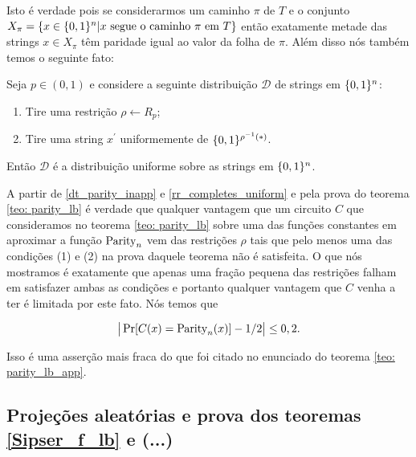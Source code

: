 Isto é verdade pois se considerarmos um caminho $\pi$ de $T$ e o conjunto $X_{\pi} = \{x \in \{0, 1\}^{n} \lvert x \text{ segue o caminho } \pi \text{ em } T\}$ então exatamente metade das strings $x \in X_{\pi}$ têm paridade igual ao valor da folha de $\pi$. Além disso nós também temos o seguinte fato:

\begin{fato} \label{rr_completes_uniform}

Seja $p \in (0, 1)$ e considere a seguinte distribuição $\mathcal{D}$ de strings em $\{0, 1\}^{n}$:

\begin{enumerate}

	\item Tire uma restrição $\rho \leftarrow R_{p}$;
	
	\item Tire uma string $x^{\prime}$ uniformemente de $\{0, 1\}^{\rho^{-1}(*)}$.


\end{enumerate}

Então $\mathcal{D}$ é a distribuição uniforme sobre as strings em $\{0, 1\}^{n}$.

\end{fato}

A partir de \ref{dt_parity_inapp} e \ref{rr_completes_uniform} e pela prova do teorema \ref{teo: parity_lb} é verdade que qualquer vantagem que um circuito $C$ que consideramos no teorema \ref{teo: parity_lb} sobre uma das funções constantes em aproximar a função $\text{Parity}_{n}$ vem das restrições $\rho$ tais que pelo menos uma das condições (1) e (2) na prova daquele teorema não é satisfeita. O que nós mostramos é exatamente que apenas uma fração pequena das restrições falham em satisfazer ambas as condições e portanto qualquer vantagem que $C$ venha a ter é limitada por este fato. Nós temos que

\begin{equation*}
	\big\lvert \Pr[C(x) = \text{Parity}_{n}(x)] - 1/2 \big\rvert \leq 0,2.
\end{equation*}

Isso é uma asserção mais fraca do que foi citado no enunciado do teorema \ref{teo: parity_lb_app}.

\subsection{Projeções aleatórias e prova dos teoremas \ref{Sipser_f_lb} e (...)}

